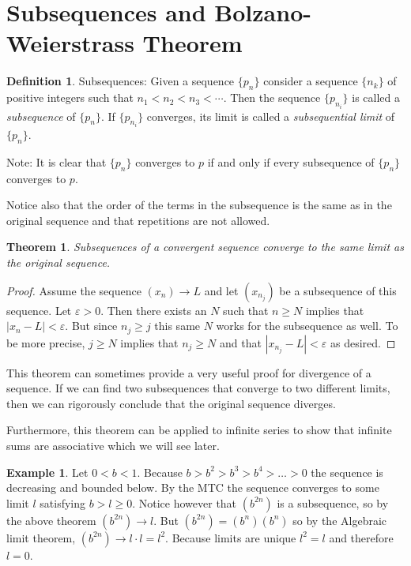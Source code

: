 \documentclass{tufte-book}
\newtheorem{theorem}{Theorem}[chapter]
\theoremstyle{definition}
\newtheorem{definition}{Definition}[chapter]
\newtheorem*{example}{Example}
\numberwithin{section}{chapter}
\begin{document}
\section{Subsequences and Bolzano-Weierstrass Theorem}

\begin{definition}Subsequences:  Given a sequence $\{p_n\}$ consider a sequence $\{n_k\}$ of positive integers such that $n_1 < n_2 < n_3 < \cdots$.  Then the sequence $\{p_{n_i}\}$ is called a \emph{subsequence} of $\{p_n\}$.  If $\{p_{n_i}\}$ converges, its limit is called a \emph{subsequential limit} of $\{p_{n}\}$.
\end{definition}
\medskip
Note:  It is clear that $\{p_{n}\}$ converges to $p$ if and only if every subsequence of $\{p_{n}\}$ converges to $p$. 

Notice also that the order of the terms in the subsequence is the same as in the original sequence and that repetitions are not allowed.

\begin{theorem} Subsequences of a convergent sequence converge to the same limit as the original sequence.\end{theorem}

\begin{proof} 
Assume the sequence $(x_n) \to L$ and let $(x_{n_j})$ be a subsequence of this sequence.  
Let $\varepsilon > 0$.  Then there exists an $N$ such that $n \geq N$ implies that $|x_n - L| < \varepsilon$.  But since $n_j \geq j$ this same $N$ works for the subsequence as well.  To be more precise, $j\geq N$ implies that $n_j \geq N$ and that $|x_{n_j} - L| < \varepsilon$ as desired.


\end{proof}

This theorem can sometimes provide a very useful proof for divergence of a sequence.  If we can find two subsequences that converge to two different limits, then we can rigorously conclude that the original sequence diverges.

Furthermore, this theorem can be applied to infinite series to show that infinite sums are associative which we will see later.

\begin{example} Let $0 < b< 1$.  Because $b >b^2 > b^3 > b^4 > \ldots > 0$ the sequence is decreasing and bounded below.  By the MTC the sequence converges to some limit $l$ satisfying $b > l \geq 0$.   Notice however that $(b^{2n})$ is a subsequence, so by the above theorem $(b^{2n}) \to l$. But $(b^{2n}) = (b^n)( b^n)$ so by the Algebraic limit theorem, $(b^{2n}) \to l \cdot l = l^2$.  Because limits are unique $l^2 = l$ and therefore $l=0$.
\end{example}
\end{document}
